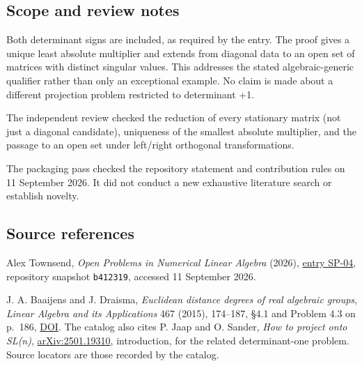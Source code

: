 \documentclass[10pt,a4paper]{article}
\begin{document}
\subsection{Scope and review notes}\label{scope-and-review-notes}

Both determinant signs are included, as required by the entry. The proof
gives a unique least absolute multiplier and extends from diagonal data
to an open set of matrices with distinct singular values. This addresses
the stated algebraic-generic qualifier rather than only an exceptional
example. No claim is made about a different projection problem
restricted to determinant +1.

The independent review checked the reduction of every stationary matrix
(not just a diagonal candidate), uniqueness of the smallest absolute
multiplier, and the passage to an open set under left/right orthogonal
transformations.

The packaging pass checked the repository statement and contribution
rules on 11 September 2026. It did not conduct a new exhaustive
literature search or establish novelty.

\subsection{Source references}\label{source-references}

Alex Townsend, \emph{Open Problems in Numerical Linear Algebra} (2026),
\href{https://github.com/ajt60gaibb/OpenProblemsInNLA/blob/b4123194697bdf6f8f82518c1dd7d6c40a30c2e0/eigenvalues-and-inverse-problems/SP-04/README.md}{entry
SP-04}, repository snapshot \texttt{b412319}, accessed 11 September
2026.

J. A. Baaijens and J. Draisma, \emph{Euclidean distance degrees of real
algebraic groups}, \emph{Linear Algebra and its Applications} 467
(2015), 174--187, §4.1 and Problem 4.3 on p.~186,
\href{https://doi.org/10.1016/j.laa.2014.11.012}{DOI}. The catalog also
cites P. Jaap and O. Sander, \emph{How to project onto SL(n)},
\href{https://arxiv.org/abs/2501.19310}{arXiv:2501.19310}, introduction,
for the related determinant-one problem. Source locators are those
recorded by the catalog.
\end{document}
